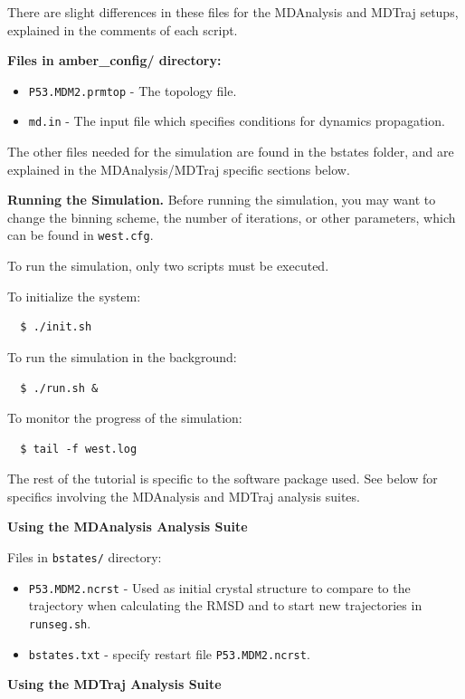 There are slight differences in these files for the MDAnalysis and MDTraj setups, explained in the comments of each script.

\noindent \textbf{Files in amber\_config/ directory:}
\begin{itemize} 
\item \verb|P53.MDM2.prmtop| - The topology file.
\item \verb|md.in| - The input file which specifies conditions for dynamics propagation.
\end{itemize}

The other files needed for the simulation are found in the bstates folder, and are explained in the MDAnalysis/MDTraj specific sections below.

\textbf{Running the Simulation.} Before running the simulation, you may want to change the binning scheme, the number of iterations, or other parameters, which can be found in \verb|west.cfg|.

\noindent To run the simulation, only two scripts must be executed. 

\noindent To initialize the system:

\begin{verbatim}
  $ ./init.sh
\end{verbatim}

\noindent To run the simulation in the background:
\begin{verbatim}
  $ ./run.sh &
\end{verbatim}

\noindent To monitor the progress of the simulation:
\begin{verbatim}
  $ tail -f west.log
\end{verbatim}

The rest of the tutorial is specific to the software package used. 
See below for specifics involving the MDAnalysis and MDTraj analysis suites.

\textbf{Using the MDAnalysis Analysis Suite}

Files in \verb|bstates/| directory:
\begin{itemize}
\item \verb|P53.MDM2.ncrst| - Used as initial crystal structure to compare to the trajectory when calculating the RMSD and to start new trajectories in \verb|runseg.sh|.
\item \verb|bstates.txt| - specify restart file \verb|P53.MDM2.ncrst|.
\end{itemize}

\textbf{Using the MDTraj Analysis Suite}

